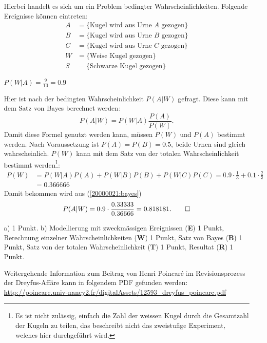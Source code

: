 
\begin{loesung}
Hierbei handelt es sich um ein Problem bedingter Wahrscheinlichkeiten.
Folgende Ereignisse können eintreten:
\begin{align*}
A&=\{\text{Kugel wird aus Urne $A$ gezogen}\}\\
B&=\{\text{Kugel wird aus Urne $B$ gezogen}\}\\
C&=\{\text{Kugel wird aus Urne $C$ gezogen}\}\\
W&=\{\text{Weise Kugel gezogen}\}\\
S&=\{\text{Schwarze Kugel gezogen}\}
\end{align*}
\begin{teilaufgaben}
\item $P(W|A)=\frac{9}{10}= 0.9$
\item Hier ist nach der bedingten Wahrscheinlichkeit $P(A|W)$ gefragt.
Diese kann mit dem Satz von Bayes berechnet werden:
\begin{equation}
P(A|W)=P(W|A)\frac{P(A)}{P(W)}.
\label{20000021:bayes}
\end{equation}
Damit diese Formel genutzt werden kann, müssen $P(W)$ und $P(A)$
bestimmt werden.
Nach Voraussetzung ist $P(A)=P(B)=0.5$, beide Urnen sind gleich
wahrscheinlich. $P(W)$ kann mit dem Satz von der totalen
Wahrscheinlichkeit bestimmt werden\footnote{Es ist nicht zulässig,
einfach die Zahl der weissen Kugel durch die Gesamtzahl der Kugeln
zu teilen, das beschreibt nicht das zweistufige Experiment, welches hier
durchgeführt wird.}:
\begin{align*}
P(W)&=P(W|A)P(A)+P(W|B)P(B)+P(W|C)P(C)
     =0.9\cdot \frac13+0.1\cdot \frac23
\\
    &=0.366666
\end{align*}
Damit bekommen wird aus
(\ref{20000021:bayes})
\[
P(A|W)=0.9\cdot\frac{0.33333}{0.36666}=0.818181.
\qedhere
\]
\end{teilaufgaben}
\end{loesung}

\begin{bewertung}
a) 1 Punkt.
b) Modellierung mit zweckmässigen Ereignissen ({\bf E}) 1 Punkt,
Berechnung einzelner Wahrscheinlichkeiten ({\bf W}) 1 Punkt,
Satz von Bayes ({\bf B}) 1 Punkt,
Satz von der totalen Wahrscheinlichkeit ({\bf T}) 1 Punkt,
Resultat ({\bf R}) 1 Punkt.
\end{bewertung}

\begin{diskussion}
Weitergehende Information zum Beitrag von Henri Poincar\'e im Revisionsprozess
der Dreyfus-Affäre kann in folgendem PDF gefunden werden:
\url{http://poincare.univ-nancy2.fr/digitalAssets/12593_dreyfus_poincare.pdf}
\end{diskussion}


